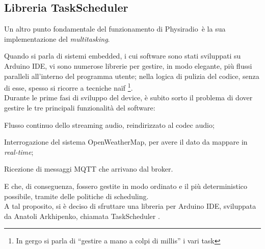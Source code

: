 \documentclass[12pt,a4paper]{report}
\newcommand{\physiradio}{Physiradio} %
\begin{document}
\subsection{Libreria TaskScheduler}

Un altro punto fondamentale del funzionamento di \physiradio\ è la sua implementazione del \textit{multitasking}.

Quando si parla di sistemi embedded, i cui software sono stati sviluppati su Arduino IDE, vi sono numerose librerie per gestire, in modo elegante, più flussi paralleli all'interno del programma utente; nella logica di pulizia del codice, senza di esse, spesso si ricorre a tecniche naïf \footnote{In gergo si parla di ``gestire a mano a colpi di millis'' i vari task}.\\
Durante le prime fasi di sviluppo del device, è subito sorto il problema di dover gestire le tre principali funzionalità del software: 

\begin{compactitem}
	\item Flusso continuo dello streaming audio, reindirizzato al codec audio;
	\item Interrogazione del sistema OpenWeatherMap, per avere il dato da mappare in \textit{real-time};
	\item Ricezione di messaggi MQTT che arrivano dal broker.
\end{compactitem}  
E che, di conseguenza, fossero gestite in modo ordinato e il più deterministico possibile, tramite delle politiche di scheduling. \\
A tal proposito, si è deciso di sfruttare una libreria per Arduino IDE, sviluppata da Anatoli Arkhipenko, chiamata TaskScheduler \cite{taskScheduler}.
\end{document}
